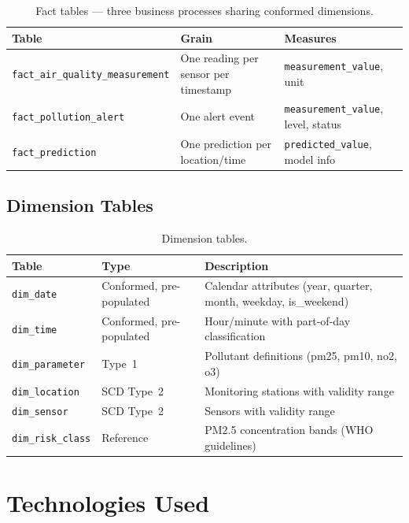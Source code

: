 \documentclass[11pt,a4paper]{article}
\begin{document}
\begin{table}[H]
\centering
\small
\begin{tabular}{@{}lll@{}}
\toprule
\textbf{Table} & \textbf{Grain} & \textbf{Measures} \\
\midrule
\texttt{fact\_air\_quality\_measurement} & One reading per sensor per timestamp & \texttt{measurement\_value}, unit \\
\texttt{fact\_pollution\_alert} & One alert event & \texttt{measurement\_value}, level, status \\
\texttt{fact\_prediction} & One prediction per location/time & \texttt{predicted\_value}, model info \\
\bottomrule
\end{tabular}
\caption{Fact tables --- three business processes sharing conformed dimensions.}
\end{table}

\subsection*{Dimension Tables}

\begin{table}[H]
\centering
\small
\begin{tabular}{@{}llp{6.5cm}@{}}
\toprule
\textbf{Table} & \textbf{Type} & \textbf{Description} \\
\midrule
\texttt{dim\_date} & Conformed, pre-populated & Calendar attributes (year, quarter, month, weekday, is\_weekend) \\
\texttt{dim\_time} & Conformed, pre-populated & Hour/minute with part-of-day classification \\
\texttt{dim\_parameter} & Type~1 & Pollutant definitions (pm25, pm10, no2, o3) \\
\texttt{dim\_location} & SCD Type~2 & Monitoring stations with validity range \\
\texttt{dim\_sensor} & SCD Type~2 & Sensors with validity range \\
\texttt{dim\_risk\_class} & Reference & PM2.5 concentration bands (WHO guidelines) \\
\bottomrule
\end{tabular}
\caption{Dimension tables.}
\end{table}

\section{Technologies Used}
\end{document}
